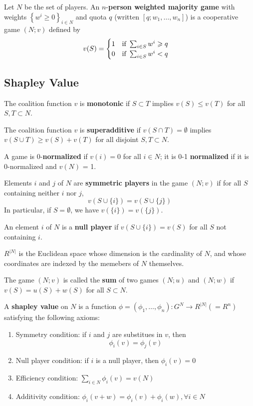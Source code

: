 \documentclass[11pt,a4paper]{article}
\begin{document}
Let $N$ be the set of players. An $n$-\textbf{person weighted majority game} with weights $\left\{w^i \geqslant 0\right\}_{i \in N}$ and quota $q$ (written $[q;w_1, \dots, w_n]$) is a cooperative game $(N;v)$ defined by
\[
v(S) = 
\begin{cases}
    1 \text{\quad if } \sum_{i \in S} w^i \geqslant q \\
    0 \text{\quad if } \sum_{i \in S} w^i < q
\end{cases}
\]

\subsection{Shapley Value}
The coalition function $v$ is \textbf{monotonic} if $S \subset T$ implies $v(S) \leqslant v(T)$ for all $S, T \subset N$. \par

The coalition function $v$ is \textbf{superadditive} if $v(S \cap T) = \emptyset$ implies $v(S \cup T) \geqslant v(S) + v(T)$ for all disjoint $S, T \subset N$. \par

A game is 0-\textbf{normalized} if $v(i) = 0$ for all $i \in N$; it is 0-1 \textbf{normalized} if it is 0-normalized and $v(N)$ = 1. \par

Elements $i$ and $j$ of $N$ are \textbf{symmetric players} in the game $(N;v)$ if for all $S$ containing neither $i$ nor $j$, 
\[
v(S \cup \{i\}) = v(S \cup \{j\})
\]
In particular, if $S = \emptyset$, we have $v(\{i\}) = v(\{j\})$. \par

An element $i$ of $N$ is a \textbf{null player} if $v(S \cup \{i\}) = v(S)$ for all $S$ not containing $i$. \par
$R^{|N|}$ is the Euclidean space whose dimension is the cardinality of $N$, and whose coordinates are indexed by the memebers of $N$ themselves. \par
The game $(N;v)$ is called the \textbf{sum} of two games $(N; u)$ and $(N; w)$ if $v(S) = u(S) + w(S)$ for all $S \subset N$. \par

A \textbf{shapley value} on $N$ is a function $\phi = (\phi_1, \dots, \phi_n): G^N \rightarrow R^{|N|} (= R^n)$ satisfying the following axioms:
\begin{enumerate}
    \item [1. ] Symmetry condition: if $i$ and $j$ are substitues in $v$, then
        \[
        \phi_i(v) = \phi_j(v)
        \]
    \item [2. ] Null player condition: if $i$ is a null player, then $\phi_i(v) = 0$
    \item [3. ] Efficiency condition: $\sum_{i \in N} \phi_i(v) = v(N)$
    \item [4. ] Additivity condition: $\phi_i(v + w) = \phi_i(v) + \phi_i(w), \forall i \in N$
\end{enumerate}
\end{document}
